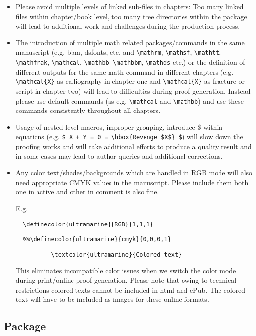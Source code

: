 \documentclass[graybox]{svmult}
\begin{document}
\begin{refguide}
\begin{sloppy}
\begin{itemize}
\item Please avoid multiple levels of linked sub-files in chapters: Too many linked files within chapter/book level, too many tree directories within the package will lead to additional work and challenges during the production process.

\item The introduction of multiple math related packages/commands in the same manuscript (e.g. bbm, dsfonts, etc. and \verb|\mathrm|, \verb|\mathsf|, \verb|\mathtt|, \verb|\mathfrak|, \verb|\mathcal|, \verb|\mathbb|, \verb|\mathbbm|, \verb|\mathds| etc.) or the definition of different outputs for the same math command in different chapters (e.g. \verb|\mathcal{X}| as calliography in chapter one and \verb|\mathcal{X}| as fracture or script in chapter two) will lead to difficulties during proof generation. Instead please use default commands (as e.g. \verb|\mathcal| and \verb|\mathbb|) and use these commands consistently throughout all chapters.

\item Usage of nested level macros, improper grouping, introduce \$ within equations (e.g. \verb|$ X + Y = 0 = \hbox{Revenge $X$} $|) will slow down the proofing works and will take additional efforts to produce a quality result and in some cases may lead to author queries and additional corrections.

\item Any color text/shades/backgrounds which are handled in RGB mode will also need appropriate CMYK values in the manuscript. Please include them both one in active and other in comment is also fine. 
    
\noindent
E.g. 
\begin{center}
\verb|	\definecolor{ultramarine}{RGB}{1,1,1}|

\verb|	%%\definecolor{ultramarine}{cmyk}{0,0,0,1}|
		
\verb|	        \textcolor{ultramarine}{Colored text}|
\end{center}
    
\noindent
This eliminates incompatible color issues when we switch the color mode during print/online proof generation. Please note that owing to technical restrictions colored texts cannot be included in html and ePub. The colored text will have to be included as images for these online formats.

\end{itemize}

\subsection*{Package}


\end{sloppy}
\end{refguide}
\end{document}
